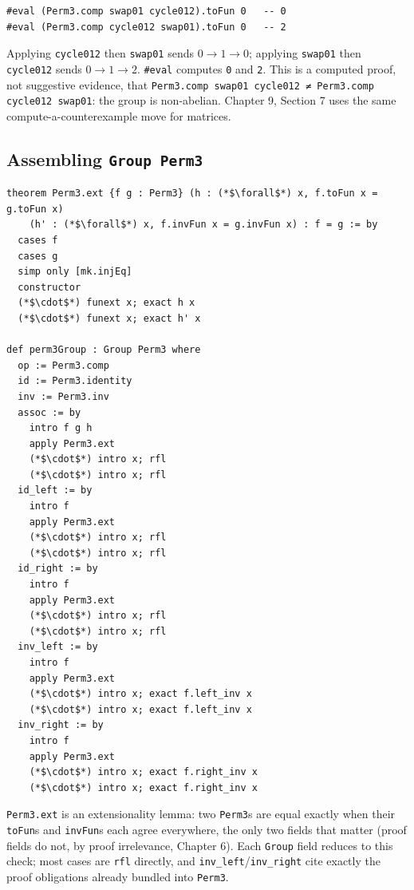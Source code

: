\begin{lstlisting}
#eval (Perm3.comp swap01 cycle012).toFun 0   -- 0
#eval (Perm3.comp cycle012 swap01).toFun 0   -- 2
\end{lstlisting}

Applying \texttt{cycle012} then \texttt{swap01} sends \(0 \to 1 \to 0\); applying \texttt{swap01} then \texttt{cycle012} sends \(0 \to 1 \to 2\). \texttt{\#eval} computes \texttt{0} and \texttt{2}. This is a computed proof, not suggestive evidence, that \texttt{Perm3.comp swap01 cycle012 ≠ Perm3.comp cycle012 swap01}: the group is non-abelian. Chapter 9, Section 7 uses the same compute-a-counterexample move for matrices.

\subsection{\texorpdfstring{Assembling \texttt{Group\ Perm3}}{Assembling Group Perm3}}\label{sec:07-groups:04-permutations-example:5}

\begin{lstlisting}
theorem Perm3.ext {f g : Perm3} (h : (*$\forall$*) x, f.toFun x = g.toFun x)
    (h' : (*$\forall$*) x, f.invFun x = g.invFun x) : f = g := by
  cases f
  cases g
  simp only [mk.injEq]
  constructor
  (*$\cdot$*) funext x; exact h x
  (*$\cdot$*) funext x; exact h' x

def perm3Group : Group Perm3 where
  op := Perm3.comp
  id := Perm3.identity
  inv := Perm3.inv
  assoc := by
    intro f g h
    apply Perm3.ext
    (*$\cdot$*) intro x; rfl
    (*$\cdot$*) intro x; rfl
  id_left := by
    intro f
    apply Perm3.ext
    (*$\cdot$*) intro x; rfl
    (*$\cdot$*) intro x; rfl
  id_right := by
    intro f
    apply Perm3.ext
    (*$\cdot$*) intro x; rfl
    (*$\cdot$*) intro x; rfl
  inv_left := by
    intro f
    apply Perm3.ext
    (*$\cdot$*) intro x; exact f.left_inv x
    (*$\cdot$*) intro x; exact f.left_inv x
  inv_right := by
    intro f
    apply Perm3.ext
    (*$\cdot$*) intro x; exact f.right_inv x
    (*$\cdot$*) intro x; exact f.right_inv x
\end{lstlisting}

\texttt{Perm3.ext} is an extensionality lemma: two \texttt{Perm3}s are equal exactly when their \texttt{toFun}s and \texttt{invFun}s each agree everywhere, the only two fields that matter (proof fields do not, by proof irrelevance, Chapter 6). Each \texttt{Group} field reduces to this check; most cases are \texttt{rfl} directly, and \texttt{inv\_\allowbreak{}left}/\texttt{inv\_\allowbreak{}right} cite exactly the proof obligations already bundled into \texttt{Perm3}.

